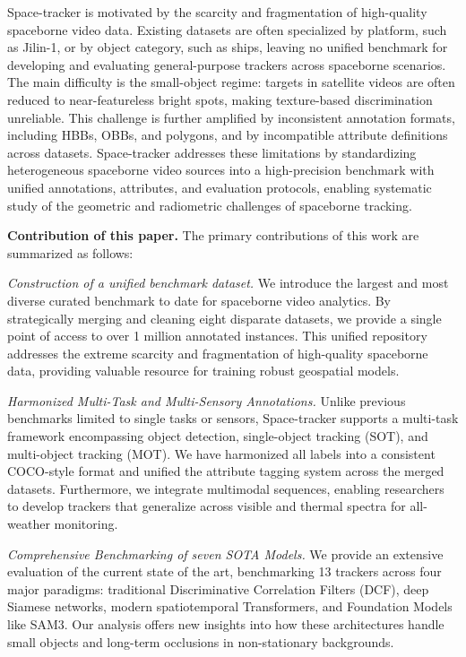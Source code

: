 \documentclass{article}
\begin{document}
Space-tracker is motivated by the scarcity and fragmentation of high-quality spaceborne video data. Existing datasets are often specialized by platform, such as Jilin-1, or by object category, such as ships, leaving no unified benchmark for developing and evaluating general-purpose trackers across spaceborne scenarios. The main difficulty is the small-object regime: targets in satellite videos are often reduced to near-featureless bright spots, making texture-based discrimination unreliable. This challenge is further amplified by inconsistent annotation formats, including HBBs, OBBs, and polygons, and by incompatible attribute definitions across datasets. Space-tracker addresses these limitations by standardizing heterogeneous spaceborne video sources into a high-precision benchmark with unified annotations, attributes, and evaluation protocols, enabling systematic study of the geometric and radiometric challenges of spaceborne tracking.

\noindent\textbf{Contribution of this paper.}
The primary contributions of this work are summarized as follows:

\noindent \textit{Construction of a unified benchmark dataset.} We introduce the largest and most diverse curated benchmark to date for spaceborne video analytics. By strategically merging and cleaning eight disparate
datasets, we provide a single point of access to over 1 million annotated instances. This unified repository
addresses the extreme scarcity and fragmentation of high-quality spaceborne data, providing valuable resource for training robust geospatial models.

\noindent\textit{Harmonized Multi-Task and Multi-Sensory Annotations.} Unlike previous benchmarks limited to single tasks or sensors, Space-tracker supports a multi-task framework encompassing object detection, single-object tracking
(SOT), and multi-object tracking (MOT). We have harmonized all labels into a consistent COCO-style format and unified the attribute tagging system across the merged datasets. Furthermore, we integrate multimodal sequences, enabling researchers to develop trackers that generalize across visible and thermal spectra for all-weather monitoring.

\noindent\textit{Comprehensive Benchmarking of seven SOTA Models.} We provide an extensive evaluation of the current state of the art, benchmarking 13 trackers across four major paradigms: traditional Discriminative Correlation Filters (DCF), deep Siamese networks, modern spatiotemporal Transformers, and Foundation Models like SAM3. Our analysis offers
new insights into how these architectures handle small objects and long-term occlusions in non-stationary backgrounds.
\end{document}
